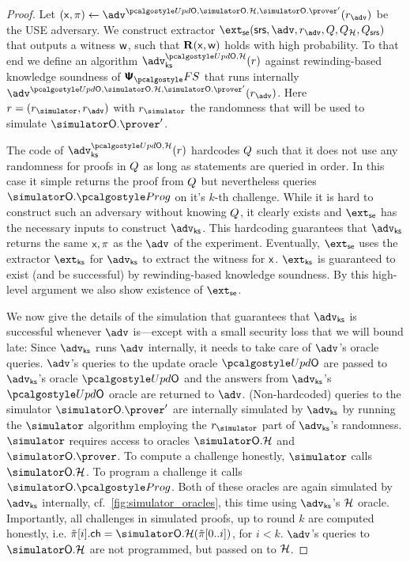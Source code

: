 \begin{proof}	
	Let $(\inp, \zkproof) \gets \advse^{\initU, \simOH, \simOP'}(r_{\advse})$ be the USE adversary. We construct extractor $\extse (\srs, \advse, r_{\advse}, \Qsim, \Qro, \Qsrs)$ that outputs a witness $\mathsf{w}$, such that $\mathbf{R}(\mathsf{x}, \mathsf{w})$ holds with high probability. To that end we define an algorithm $\advcss^{\initU,\ro}(r)$ against rewinding-based knowledge soundness of $\psfs$ that runs internally $\advse^{\initU, \simOH, \simOP'}(r_{\advse})$. Here $r = (\rsim, r_{\advse})$ with $\rsim$ the randomness that will be used to simulate $\simOP'$. 

	The code of $\advcss^{\initU,\ro}(r)$ hardcodes $Q$ such that it does not use any randomness for proofs in $Q$ as long as statements are queried in order. In this case it simple returns the proof from $Q$ but nevertheless queries $\simOHprog$ on it's $k$-th challenge. While it is hard to construct such an adversary without knowing $Q$, it clearly exists and $\extse$ has the necessary inputs to construct $\advcss$. This hardcoding guarantees that $\advcss$ returns the same $\mathsf{x},\pi$ as the $\advse$ of the experiment.
	Eventually, $\extse$ uses the extractor $\extcss$ for $\advcss$ to extract the witness for $\mathsf{x}$. $\extcss$ is guaranteed to exist (and be successful) by rewinding-based knowledge soundness. By this high-level argument we also show existence of $\extse$.
	
	We now give the details of the simulation that guarantees that $\advcss$ is successful whenever $\advse$ is---except with a small security loss that we will bound late:
	Since $\advcss$ runs $\advse$ internally, it needs to take care of $\advse$'s oracle queries.
	$\advse$'s queries to the update oracle $\initU$ are passed to $\advcss$'s oracle $\initU$ and the answers from $\advcss$'s $\initU$ oracle are returned to $\advse$.
	(Non-hardcoded) queries to the simulator $\simOP'$ are internally simulated by $\advcss$  by running the $\simulator$ algorithm employing the $\rsim$ part of $\advcss$'s randomness. $\simulator$ requires access to oracles $\simOH$ and $\simOP$. To compute a challenge honestly, $\simulator$ calls $\simOH$. To program a challenge it calls $\simOHprog$. Both of these oracles are again simulated by $\advcss$ internally, cf.~\cref{fig:simulator_oracles}, this time using $\advcss$'s $\mathcal{H}$ oracle. Importantly, all challenges in simulated proofs, up to round $k$ are computed honestly, i.e. $\tzkproof[i].\ch = \simOH(\tzkproof[0..i])$, for $i < k$.
	$\advse$'s queries to $\simOH$ are not programmed, but passed on to $\mathcal{H}$. 


\end{proof}
